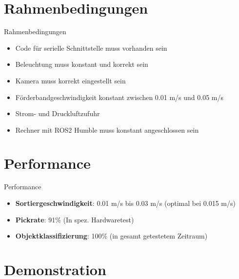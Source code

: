 \documentclass[aspectratio=169]{beamer}
\begin{document}
	\section{Rahmenbedingungen}
	
	\begin{frame}{Rahmenbedingungen}
		\begin{itemize}
			\item Code für serielle Schnittstelle muss vorhanden sein
			\item Beleuchtung muss konstant und korrekt sein
			\item Kamera muss korrekt eingestellt sein
			\item Förderbandgeschwindigkeit konstant zwischen 0.01 m/s und 0.05 m/s
			\item Strom- und Druckluftzufuhr
			\item Rechner mit ROS2 Humble muss konstant angeschlossen sein
		\end{itemize}
	\end{frame}
	
	\section{Performance}
	
	\begin{frame}{Performance}
		\begin{itemize}
			\item \textbf{Sortiergeschwindigkeit}: 0.01 m/s bis 0.03 m/s (optimal bei 0.015 m/s)
			\item \textbf{Pickrate}: 91\% (In spez. Hardwaretest)
			\item \textbf{Objektklassifizierung}: 100\% (in gesamt getestetem Zeitraum)
		\end{itemize}
	\end{frame}
	
	\section{Demonstration}
		
\end{document}
